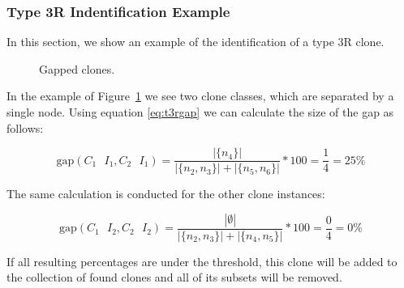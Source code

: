 \subsubsection{Type 3R Indentification Example}
In this section, we show an example of the identification of a type 3R clone.

\begin{figure}[H]
\begin{parcolumns}{2}
\end{parcolumns}
\caption{Gapped clones.}
\label{fig:3ropportunities}
\end{figure}

In the example of Figure~\ref{fig:3ropportunities} we see two clone classes, which are separated by a single node. Using equation \ref{eq:t3rgap} we can calculate the size of the gap as follows:

\begin{equation}\label{eq:t3rexample}
\text{gap}(C_1\text{ }I_1, C_2\text{ }I_1) = \frac{|\{n_4\}|}{|\{n_2, n_3\}| + |\{n_5, n_6\}|} * 100 = \frac{1}{4} = 25\%
\end{equation}

The same calculation is conducted for the other clone instances:

\begin{equation}\label{eq:t3rexample2}
\text{gap}(C_1\text{ }I_2, C_2\text{ }I_2) = \frac{|\emptyset|}{|\{n_2, n_3\}| + |\{n_4, n_5\}|} * 100 = \frac{0}{4} = 0\%
\end{equation}

If all resulting percentages are under the threshold, this clone will be added to the collection of found clones and all of its subsets will be removed.


